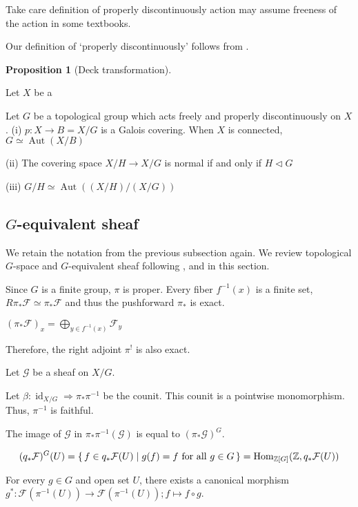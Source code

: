 \documentclass[a4paper,dvipdfmx,reqno,12pt]{amsart}
\theoremstyle{definition}
\newtheorem{Prop}[Thm]{Proposition}
\newcommand{\Z}{\mathbb{Z}}%
\newcommand{\mcal}[1]{\mathcal{#1}}%
\newcommand{\opn}[1]{\operatorname{#1}}
\numberwithin{equation}{section}
\begin{document}
Take care definition of properly discontinuously action
may assume freeness of the action in some textbooks.

Our definition of `properly discontinuously' follows from
\cite[1.3 Exercise 23]{hatcherAlgebraicTopology2002a}.


\begin{Prop}[Deck transformation] \label{galois}

  Let $X$ be a

  Let $G$ be a topological group which acts freely and properly discontinuously on $X$.
  (i) $p: X \to B=X/G$ is a Galois covering. When $X$ is connected, $G\simeq \opn{Aut}(X/ B)$

  (ii) The covering space $X/H \to X/G$ is normal if and only if $H \triangleleft G$

  (iii) $G/H \simeq \opn{Aut}((X/H)/(X/G))$
\end{Prop}

\subsection{$G$-equivalent sheaf}
We retain the notation from the previous subsection again.
We review topological $G$-space and $G$-equivalent sheaf
following \cite{grothendieckQuelquesPointsAlgebre1957a},
\cite{bernsteinEquivariantSheavesFunctors1994a} and
\cite[II. p.137]{bredonSheafTheory1997a}
in this section.

Since $G$ is a finite group,
$\pi$ is proper.
Every fiber $f^{-1}(x)$ is a finite set,
$R\pi_*\mcal{F}\simeq \pi_*\mcal{F}$
and thus the pushforward $\pi_*$ is exact.

$(\pi_*\mcal{F})_x=\bigoplus_{y\in f^{-1}(x)}\mcal{F}_y$

Therefore, the right adjoint $\pi^{!}$ is also exact.

Let $\mcal{G}$ be a sheaf on $X/G$.

Let $\beta:\opn{id}_{X/G} \Rightarrow \pi_*\pi^{-1} $ be
the counit. This counit is a pointwise monomorphism.
Thus, $\pi^{-1}$ is faithful.

The image of $\mcal{G}$ in $\pi_*\pi^{-1}(\mcal{G})$ is
equal to $(\pi_*\mcal{G})^{G}$.


\begin{align}
  (q_* \mcal{F})^{G}(U)=\set{f\in q_{*}\mcal{F}(U) \mid g(f)=f \text{ for all }g\in G}=\opn{Hom}_{\Z[G]}(\Z, q_*\mcal{F}(U))
\end{align}

For every $g\in G$ and open set $U$, there exists a
canonical morphism
$g^{*}:\mcal{F}(\pi^{-1}(U))\to \mcal{F}(\pi^{-1}(U));f\mapsto f\circ g$.
\end{document}
